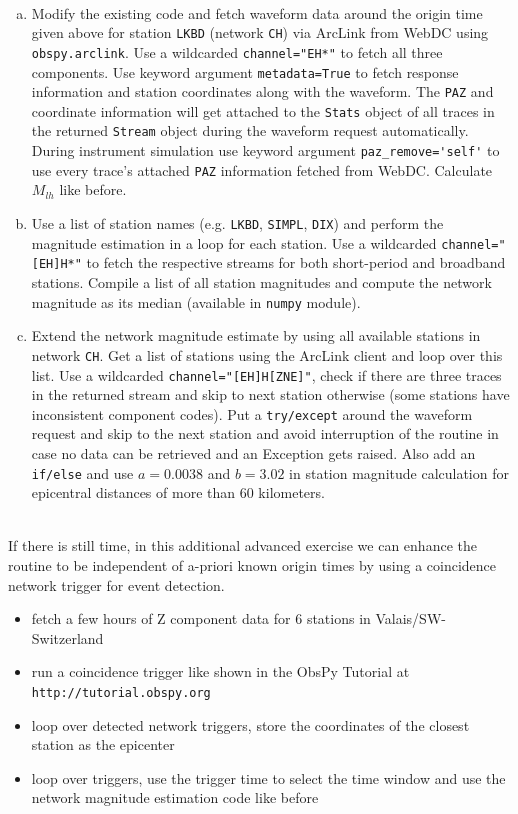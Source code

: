 \documentclass{LMUexercise}
\begin{document}
\\
\begin{enumerate}[a)]
\item
Modify the existing code and fetch waveform data around the origin time given above
for station \verb#LKBD# (network \verb#CH#) via ArcLink from WebDC using
\verb#obspy.arclink#. Use a wildcarded \verb#channel="EH*"# to fetch all three
components. Use keyword argument \verb#metadata=True# to fetch response
information and station coordinates along with the waveform. The \verb#PAZ# and
coordinate information will get attached to the \verb#Stats# object of all
traces in the returned \verb#Stream# object during the waveform request
automatically. During instrument simulation use keyword argument
\verb#paz_remove='self'# to use every trace's attached \verb#PAZ# information
fetched from WebDC. Calculate $M_{lh}$ like before.
\item
Use a list of station names (e.g. \verb#LKBD#, \verb#SIMPL#, \verb#DIX#) and
perform the magnitude estimation in a loop for each station. Use a wildcarded
\verb#channel="[EH]H*"# to fetch the respective streams for both short-period
and broadband stations. Compile a list of all station magnitudes and compute
the network magnitude as its median (available in \verb#numpy# module).
\item
Extend the network magnitude estimate by using all available stations in
network \verb#CH#. Get a list of stations using the ArcLink client and loop over
this list. Use a wildcarded \verb#channel="[EH]H[ZNE]"#, check if there are
three traces in the returned stream and skip to next station otherwise
(some stations have inconsistent component
codes). Put a \verb#try/except# around the waveform request and skip to the
next station and avoid interruption of the routine in case no data can be
retrieved and an Exception gets raised. Also add an \verb#if/else# and use
$a=0.0038$ and $b=3.02$ in station magnitude calculation for epicentral
distances of more than 60 kilometers.
\end{enumerate}
\vspace*{2.5em}

\\
If there is still time, in this additional advanced exercise we can enhance the routine to be independent of a-priori known origin times by using a coincidence network trigger for event detection.
\begin{itemize}
\item fetch a few hours of Z component data for 6 stations in Valais/SW-Switzerland
\item run a coincidence trigger like shown in the ObsPy Tutorial at \verb#http://tutorial.obspy.org#
\item loop over detected network triggers, store the coordinates of the closest station as the epicenter
\item loop over triggers, use the trigger time to select the time window and use the network magnitude estimation code like before
\end{itemize}
\vspace*{2.5em}
\end{document}

